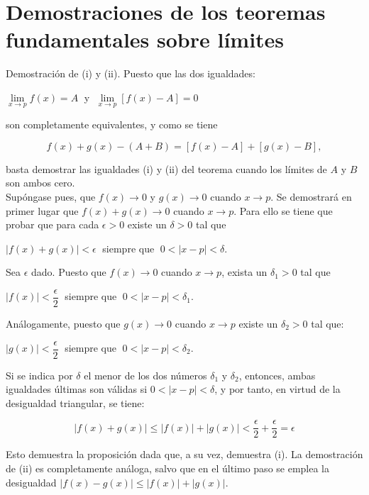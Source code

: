 \section{Demostraciones de los teoremas fundamentales sobre límites}

Demostración de (i) y (ii). Puesto que las dos igualdades:

\begin{center}
    $\lim\limits_{x\to p}f(x)=A\;$ y $\;\lim\limits_{x\to p}[f(x)-A]=0$
\end{center}

son completamente equivalentes, y como se tiene

$$f(x)+g(x)-(A+B) = [f(x)-A]+[g(x)-B],$$

basta demostrar las igualdades (i) y (ii) del teorema cuando los límites de $A$ y $B$ son ambos cero.\\
Supóngase pues, que $f(x)\to 0$ y $g(x)\to 0$ cuando $x\to p$. Se demostrará en primer lugar que $f(x)+g(x)\to 0$ cuando $x\to p$. Para ello se tiene que probar que para cada $\epsilon > 0$ existe un $\delta>0$ tal que 

\begin{center}
    $|f(x)+g(x)|<\epsilon\; $ siempre que $\;0<|x-p|<\delta.$
\end{center}

Sea $\epsilon$ dado. Puesto que $f(x)\to 0$ cuando $x\to p$, exista un $\delta_1>0$ tal que 

\begin{center}
    $|f(x)|<\dfrac{\epsilon}{2}\;$ siempre que $\; 0<|x-p|<\delta_1.$
\end{center}

Análogamente, puesto que $g(x)\to 0$ cuando $x\to p$ existe un $\delta_2>0$ tal que:

\begin{center}
    $|g(x)|<\dfrac{\epsilon}{2}\;$ siempre que $\; 0<|x-p|<\delta_2.$
\end{center}

Si se indica por $\delta$ el menor de los dos números $\delta_1$ y $\delta_2$, entonces, ambas igualdades últimas son válidas si $0<|x-p|<\delta$, y por tanto, en virtud de la desigualdad triangular, se tiene:

$$|f(x)+g(x)|\leq |f(x)|+|g(x)|<\dfrac{\epsilon}{2}+\dfrac{\epsilon}{2}=\epsilon$$

Esto demuestra la proposición dada que, a su vez, demuestra (i). La demostración de (ii) es completamente análoga, salvo que en el último paso se emplea la desigualdad $|f(x)-g(x)|\leq |f(x)|+|g(x)|.$\\\\

